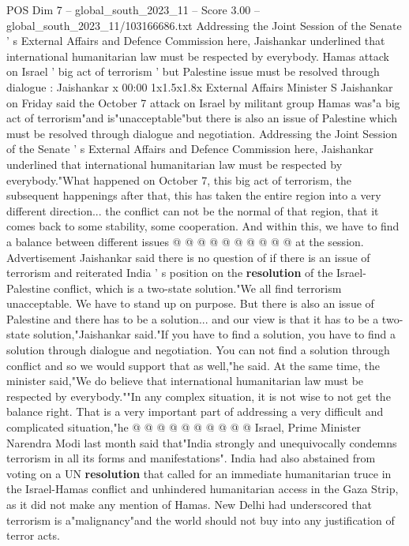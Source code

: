 \begin{textsample}{POS Dim 7 – global\_south\_2023\_11 – Score 3.00 – global\_south\_2023\_11/103166686.txt}  \label{ex:f7_pos_127}
Addressing the Joint Session of the Senate ' s External Affairs and Defence Commission here, Jaishankar underlined that international humanitarian law must be respected by everybody.
Hamas attack on Israel ' big act of terrorism ' but Palestine issue must be resolved through dialogue : Jaishankar x 00:00 1x1.5x1.8x External Affairs Minister S Jaishankar on Friday said the October 7 attack on Israel by militant group Hamas was"a big act of terrorism"and is"unacceptable"but there is also an issue of Palestine which must be resolved through dialogue and negotiation.
Addressing the Joint Session of the Senate ' s External Affairs and Defence Commission here, Jaishankar underlined that international humanitarian law must be respected by everybody."What happened on October 7, this big act of terrorism, the subsequent happenings after that, this has taken the entire region into a very different direction... the conflict can not be the normal of that region, that it comes back to some stability, some cooperation.
And within this, we have to find a balance between different issues @ @ @ @ @ @ @ @ @ @ at the session.
Advertisement Jaishankar said there is no question of if there is an issue of terrorism and reiterated India ' s position on the \textbf{resolution} of the Israel-Palestine conflict, which is a two-state solution."We all find terrorism unacceptable.
We have to stand up on purpose.
But there is also an issue of Palestine and there has to be a solution... and our view is that it has to be a two-state solution,"Jaishankar said."If you have to find a solution, you have to find a solution through dialogue and negotiation.
You can not find a solution through conflict and so we would support that as well,"he said.
At the same time, the minister said,"We do believe that international humanitarian law must be respected by everybody.""In any complex situation, it is not wise to not get the balance right.
That is a very important part of addressing a very difficult and complicated situation,"he @ @ @ @ @ @ @ @ @ @ Israel, Prime Minister Narendra Modi last month said that"India strongly and unequivocally condemns terrorism in all its forms and manifestations".
India had also abstained from voting on a UN \textbf{resolution} that called for an immediate humanitarian truce in the Israel-Hamas conflict and unhindered humanitarian access in the Gaza Strip, as it did not make any mention of Hamas.
New Delhi had underscored that terrorism is a"malignancy"and the world should not buy into any justification of terror acts.

\end{textsample}
